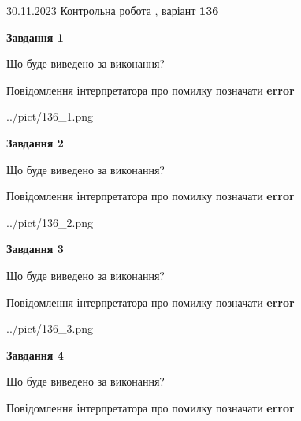 \documentclass[12pt, ukrainian]{article}
\begin{document}
{{30.11.2023 Контрольна робота , варіант  \No \textbf { 136 }\par}}
{




{\begin {center}\textbf{Завдання 1}\end {center}}\par
Що буде виведено за виконання? \par
Повідомлення інтерпретатора про помилку позначати \textbf{error}

\begin{center}
	{../pict/136_1.png}
\end{center}
\newpage

{\begin {center}\textbf{Завдання 2}\end {center}}\par
Що буде виведено за виконання? \par
Повідомлення інтерпретатора про помилку позначати \textbf{error}

\begin{center}
	{../pict/136_2.png}
\end{center}
\newpage

{\begin {center}\textbf{Завдання 3}\end {center}}\par
Що буде виведено за виконання? \par
Повідомлення інтерпретатора про помилку позначати \textbf{error}

\begin{center}
	{../pict/136_3.png}
\end{center}
\newpage

{\begin {center}\textbf{Завдання 4}\end {center}}\par
Що буде виведено за виконання? \par
Повідомлення інтерпретатора про помилку позначати \textbf{error}

}
\end{document}
